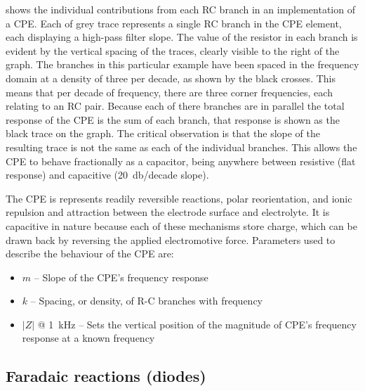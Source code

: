      shows the individual contributions from each RC branch in an implementation of a CPE.
    Each of grey trace represents a single RC branch in the CPE element, each displaying a high-pass filter slope.
    The value of the resistor in each branch is evident by the vertical spacing of the traces, clearly visible to the right of the graph.
    The branches in this particular example have been spaced in the frequency domain at a density of three per decade, as shown by the black crosses.
    This means that per decade of frequency, there are three corner frequencies, each relating to an RC pair.
    Because each of there branches are in parallel the total response of the CPE is the sum of each branch, that response is shown as the black trace on the graph.
    The critical observation is that the slope of the resulting trace is not the same as each of the individual branches.
    This allows the CPE to behave fractionally as a capacitor, being anywhere between resistive (flat response) and capacitive (\SI{20}{\decibel}/decade slope).

    The CPE is represents readily reversible reactions, polar reorientation, and ionic repulsion and attraction between the electrode surface and electrolyte.
    It is capacitive in nature because each of these mechanisms store charge, which can be drawn back by reversing the applied electromotive force.
    Parameters used to describe the behaviour of the CPE are:
    \begin{itemize}
      \item $m$ -- Slope of the CPE's frequency response
      \item $k$ -- Spacing, or density, of R-C branches with frequency
      \item $|Z|$ @ \SI{1}{\kilo\hertz} -- Sets the vertical position of the magnitude of CPE's frequency response at a known frequency
    \end{itemize}


  \subsection{Faradaic reactions (diodes)}


